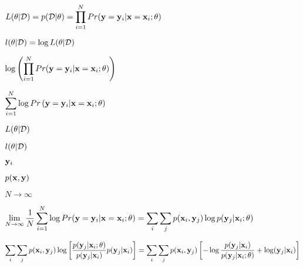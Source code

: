 \documentclass{article}
\def\lthtmlcheckvsize{\ifdim\ht\sizebox<\vsize 
  \ifdim\wd\sizebox<\hsize\expandafter\hfill\fi \expandafter\vfill
  \else\expandafter\vss\fi}%
\begin{document}
{\newpage\clearpage
{}%
$\displaystyle L(\theta|{\cal D})=p({\cal D}|\theta)
=\prod_{i=1}^N Pr({\bf y}={\bf y}_i|{\bf x}={\bf x}_i;\theta)$%
\lthtmlindisplaymathZ
\lthtmlcheckvsize\clearpage}

{\newpage\clearpage
{}%
$\displaystyle l(\theta|{\cal D})=\log L(\theta|{\cal D})$%
\lthtmlindisplaymathZ
\lthtmlcheckvsize\clearpage}

{\newpage\clearpage
{}%
$\displaystyle \log\left(\prod_{i=1}^N Pr({\bf y}={\bf y}_i|{\bf x}={\bf x}_i;\theta)\right)$%
\lthtmlindisplaymathZ
\lthtmlcheckvsize\clearpage}

{\newpage\clearpage
{}%
$\displaystyle \sum_{i=1}^N \log Pr\left({\bf y}={\bf y}_i|{\bf x}={\bf x}_i;\theta\right)$%
\lthtmlindisplaymathZ
\lthtmlcheckvsize\clearpage}

{\newpage\clearpage
{}%
$ L({\bf\theta}|{\cal D})$%
\lthtmlindisplaymathZ
\lthtmlcheckvsize\clearpage}

{\newpage\clearpage
{}%
$ l({\bf\theta}|{\cal D})$%
\lthtmlindisplaymathZ
\lthtmlcheckvsize\clearpage}

{\newpage\clearpage
{}%
$ {\bf y}_i$%
\lthtmlindisplaymathZ
\lthtmlcheckvsize\clearpage}

{\newpage\clearpage
{}%
$ p({\bf x},{\bf y})$%
\lthtmlindisplaymathZ
\lthtmlcheckvsize\clearpage}

{\newpage\clearpage
{}%
$ N\longrightarrow\infty$%
\lthtmlindisplaymathZ
\lthtmlcheckvsize\clearpage}

{\newpage\clearpage
{}%
$\displaystyle \lim\limits_{N\rightarrow\infty}\frac{1}{N}\sum_{i=1}^N
\log Pr({\bf y}={\bf y}_i|{\bf x}={\bf x}_i;\theta)
=\sum_i\sum_j p({\bf x}_i,{\bf y}_j)\log p({\bf y}_j|{\bf x}_i;\theta)$%
\lthtmlindisplaymathZ
\lthtmlcheckvsize\clearpage}

{\newpage\clearpage
{}%
$\displaystyle \sum_i\sum_j p({\bf x}_i,{\bf y}_j) \log \left[
\frac{p({\bf y}_j|{\bf x}_i;\theta)}{p({\bf y}_j|{\bf x}_i)}
p({\bf y}_j|{\bf x}_i)\right]
=\sum_i\sum_j p({\bf x}_i,{\bf y}_j) \left[-\log \frac{p({\bf y}_j|{\bf x}_i)}{p({\bf y}_j|{\bf x}_i;\theta)}+\log({\bf y}_j|{\bf x}_i)\right]$%
\lthtmlindisplaymathZ
\lthtmlcheckvsize\clearpage}
\end{document}
